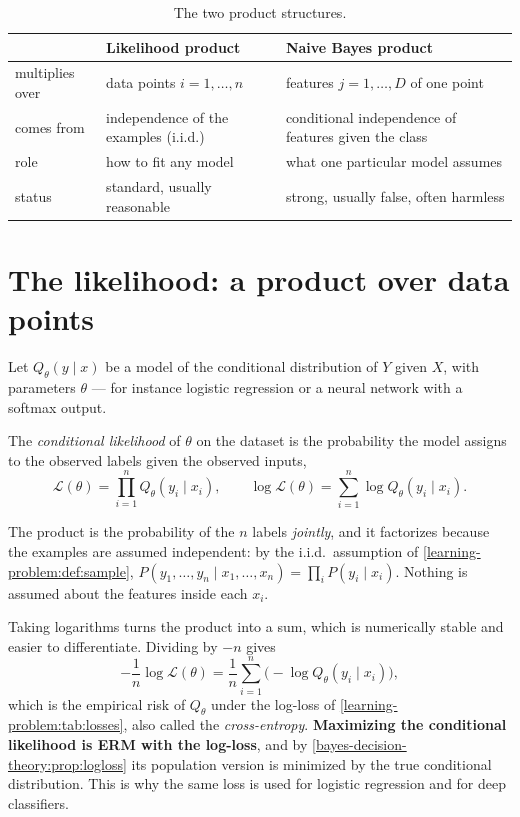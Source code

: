 \begin{notechapter}
\begin{table}[ht]
\centering
\caption{The two product structures.}
\label{generative-discriminative:tab:compare}
\begin{tabular}{@{}p{}p{}p{}@{}}
\toprule
 & Likelihood product & Naive Bayes product \\
\midrule
multiplies over & data points $i = 1,\dots,n$ & features $j = 1,\dots,D$ of one point \\
comes from & independence of the examples (i.i.d.) & conditional independence of features given the class \\
role & how to fit any model & what one particular model assumes \\
status & standard, usually reasonable & strong, usually false, often harmless \\
\bottomrule
\end{tabular}
\end{table}

\section{The likelihood: a product over data points}\label{generative-discriminative:sec:likelihood}

Let $Q_\theta(y\mid x)$ be a model of the conditional distribution of $Y$ given
$X$, with parameters $\theta$ --- for instance logistic regression or a neural
network with a softmax output.

\begin{definition}
The \emph{conditional likelihood} of $\theta$ on the dataset is the probability
the model assigns to the observed labels given the observed inputs,
\[
  \mathcal L(\theta) = \prod_{i=1}^n Q_\theta(y_i\mid x_i),
  \qquad
  \log\mathcal L(\theta) = \sum_{i=1}^n\log Q_\theta(y_i\mid x_i).
\]
\end{definition}

The product is the probability of the $n$ labels \emph{jointly}, and it
factorizes because the examples are assumed independent: by the i.i.d.\
assumption of \cref{learning-problem:def:sample},
$P(y_1,\dots,y_n\mid x_1,\dots,x_n) = \prod_i P(y_i\mid x_i)$. Nothing is
assumed about the features inside each $x_i$.

Taking logarithms turns the product into a sum, which is numerically stable
and easier to differentiate. Dividing by $-n$ gives
\[
  -\frac1n\log\mathcal L(\theta) = \frac1n\sum_{i=1}^n\bigl(-\log Q_\theta(y_i\mid x_i)\bigr),
\]
which is the empirical risk of $Q_\theta$ under the log-loss of
\cref{learning-problem:tab:losses}, also called the \emph{cross-entropy}.
\textbf{Maximizing the conditional likelihood is ERM with the log-loss}, and by
\cref{bayes-decision-theory:prop:logloss} its population version is minimized
by the true conditional distribution. This is why the same loss is used for
logistic regression and for deep classifiers.


\end{notechapter}
